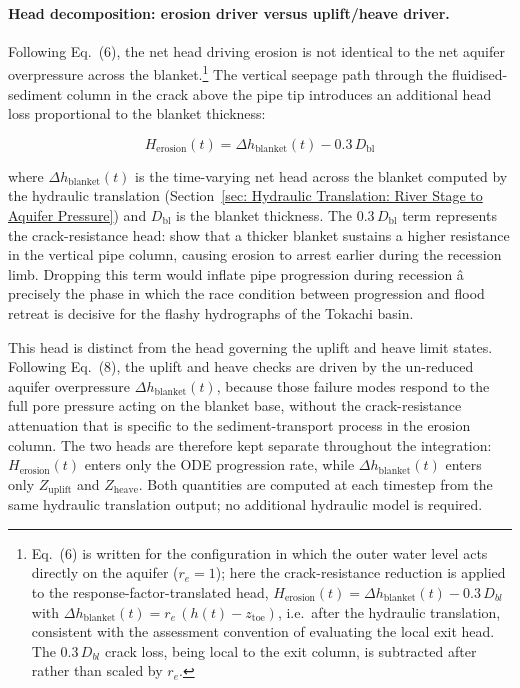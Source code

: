 \paragraph{Head decomposition: erosion driver versus uplift/heave driver.}
Following \textcite{pol_sie_2024} Eq.~(6), the net head driving erosion is not identical to the net aquifer overpressure across the blanket.\footnote{\textcite{pol_sie_2024} Eq.~(6) is written for the configuration in which the outer water level acts directly on the aquifer ($r_e = 1$); here the crack-resistance reduction is applied to the response-factor-translated head, $H_\mathrm{erosion}(t) = \Delta h_\mathrm{blanket}(t) - 0.3\,D_{bl}$ with $\Delta h_\mathrm{blanket}(t) = r_e\,(h(t) - z_\mathrm{toe})$, i.e.\ after the hydraulic translation, consistent with the assessment convention of evaluating the local exit head. The $0.3\,D_{bl}$ crack loss, being local to the exit column, is subtracted after rather than scaled by $r_e$.} The vertical seepage path through the fluidised-sediment column in the crack above the pipe tip introduces an additional head loss proportional to the blanket thickness:

$$H_\mathrm{erosion}(t) = \Delta h_\mathrm{blanket}(t) - 0.3\,D_\mathrm{bl}$$

where $\Delta h_\mathrm{blanket}(t)$ is the time-varying net head across the blanket computed by the hydraulic translation (Section~\ref{sec: Hydraulic Translation: River Stage to Aquifer Pressure}) and $D_\mathrm{bl}$ is the blanket thickness. The $0.3\,D_\mathrm{bl}$ term represents the crack-resistance head: \textcite{pol_sie_2024} show that a thicker blanket sustains a higher resistance in the vertical pipe column, causing erosion to arrest earlier during the recession limb. Dropping this term would inflate pipe progression during recession â precisely the phase in which the race condition between progression and flood retreat is decisive for the flashy hydrographs of the Tokachi basin.

This head is distinct from the head governing the uplift and heave limit states. Following \textcite{pol_sie_2024} Eq.~(8), the uplift and heave checks are driven by the un-reduced aquifer overpressure $\Delta h_\mathrm{blanket}(t)$, because those failure modes respond to the full pore pressure acting on the blanket base, without the crack-resistance attenuation that is specific to the sediment-transport process in the erosion column. The two heads are therefore kept separate throughout the integration: $H_\mathrm{erosion}(t)$ enters only the ODE progression rate, while $\Delta h_\mathrm{blanket}(t)$ enters only $Z_\mathrm{uplift}$ and $Z_\mathrm{heave}$. Both quantities are computed at each timestep from the same hydraulic translation output; no additional hydraulic model is required.

